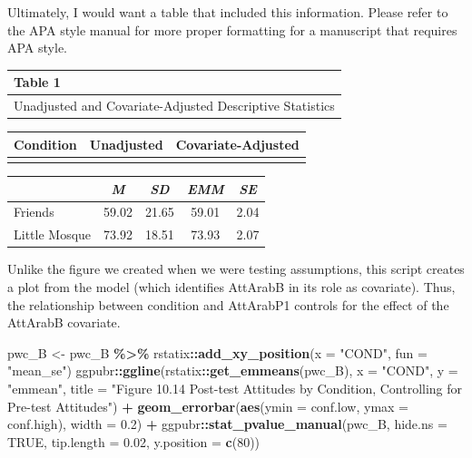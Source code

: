 \documentclass[
  11pt,
]{book}
\newenvironment{Shaded}{\begin{snugshade}}{\end{snugshade}}
\newcommand{\AttributeTok}[1]{\textcolor[rgb]{0.27,0.27,0.27}{#1}}
\newcommand{\ConstantTok}[1]{\textcolor[rgb]{0.37,0.37,0.37}{#1}}
\newcommand{\DecValTok}[1]{\textcolor[rgb]{0.06,0.06,0.06}{#1}}
\newcommand{\FloatTok}[1]{\textcolor[rgb]{0.06,0.06,0.06}{#1}}
\newcommand{\FunctionTok}[1]{\textcolor[rgb]{0.27,0.27,0.27}{\textbf{#1}}}
\newcommand{\NormalTok}[1]{#1}
\newcommand{\OtherTok}[1]{\textcolor[rgb]{0.37,0.37,0.37}{#1}}
\newcommand{\SpecialCharTok}[1]{\textcolor[rgb]{0.43,0.43,0.43}{\textbf{#1}}}
\newcommand{\StringTok}[1]{\textcolor[rgb]{0.5,0.5,0.5}{#1}}
\begin{document}
Ultimately, I would want a table that included this information. Please refer to the APA style manual for more proper formatting for a manuscript that requires APA style.

\begin{longtable}[]{@{}l@{}}
\toprule\noalign{}
Table 1 \\
\midrule\noalign{}
\endhead
\bottomrule\noalign{}
\endlastfoot
Unadjusted and Covariate-Adjusted Descriptive Statistics \\
\end{longtable}

\begin{longtable}[]{@{}lcc@{}}
\toprule\noalign{}
Condition & Unadjusted & Covariate-Adjusted \\
\midrule\noalign{}
\endhead
\bottomrule\noalign{}
\endlastfoot
\end{longtable}

\begin{longtable}[]{@{}lcccc@{}}
\toprule\noalign{}
& \emph{M} & \emph{SD} & \emph{EMM} & \emph{SE} \\
\midrule\noalign{}
\endhead
\bottomrule\noalign{}
\endlastfoot
Friends & 59.02 & 21.65 & 59.01 & 2.04 \\
Little Mosque & 73.92 & 18.51 & 73.93 & 2.07 \\
\end{longtable}

Unlike the figure we created when we were testing assumptions, this script creates a plot from the model (which identifies AttArabB in its role as covariate). Thus, the relationship between condition and AttArabP1 controls for the effect of the AttArabB covariate.

\begin{Shaded}
\begin{Highlighting}[]
\NormalTok{pwc\_B }\OtherTok{\textless{}{-}}\NormalTok{ pwc\_B }\SpecialCharTok{\%\textgreater{}\%}
\NormalTok{    rstatix}\SpecialCharTok{::}\FunctionTok{add\_xy\_position}\NormalTok{(}\AttributeTok{x =} \StringTok{"COND"}\NormalTok{, }\AttributeTok{fun =} \StringTok{"mean\_se"}\NormalTok{)}
\NormalTok{ggpubr}\SpecialCharTok{::}\FunctionTok{ggline}\NormalTok{(rstatix}\SpecialCharTok{::}\FunctionTok{get\_emmeans}\NormalTok{(pwc\_B), }\AttributeTok{x =} \StringTok{"COND"}\NormalTok{, }\AttributeTok{y =} \StringTok{"emmean"}\NormalTok{, }\AttributeTok{title =} \StringTok{"Figure 10.14 Post{-}test Attitudes by Condition, Controlling for Pre{-}test Attitudes"}\NormalTok{) }\SpecialCharTok{+}
    \FunctionTok{geom\_errorbar}\NormalTok{(}\FunctionTok{aes}\NormalTok{(}\AttributeTok{ymin =}\NormalTok{ conf.low, }\AttributeTok{ymax =}\NormalTok{ conf.high), }\AttributeTok{width =} \FloatTok{0.2}\NormalTok{) }\SpecialCharTok{+}
\NormalTok{    ggpubr}\SpecialCharTok{::}\FunctionTok{stat\_pvalue\_manual}\NormalTok{(pwc\_B, }\AttributeTok{hide.ns =} \ConstantTok{TRUE}\NormalTok{, }\AttributeTok{tip.length =} \FloatTok{0.02}\NormalTok{,}
        \AttributeTok{y.position =} \FunctionTok{c}\NormalTok{(}\DecValTok{80}\NormalTok{))}
\end{Highlighting}
\end{Shaded}
\end{document}

